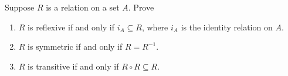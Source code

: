 \documentclass[12pt]{amsart}
\begin{document}
\begin{problem}
    Suppose $R$ is a relation on a set $A$.
    Prove
\begin{enumerate}
    \item $R$ is reflexive if and only if $i_A \subseteq R$, where $i_A$ is the identity relation on $A$.
    \item $R$ is symmetric if and only if $R = R^{-1}$.
    \item $R$ is transitive if and only if $R \circ R \subseteq R$.
\end{enumerate}
\end{problem}
\end{document}

